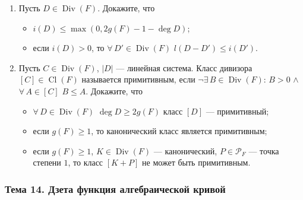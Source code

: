 \documentclass[a4paper, 12pt]{article}
\DeclareMathOperator{\Div}{Div}
\DeclareMathOperator{\Cl}{Cl}
\begin{document}
\begin{enumerate}[noitemsep,topsep=0pt]
    \item Пусть $D\in\Div(F)$. Докажите, что
    \begin{itemize}[noitemsep,topsep=0pt]
        \item $i(D)\leqslant \max(0,2g(F)-1-\deg D)$;
        \item если $i(D)>0$, то $\forall\, D'\in\Div(F)$ $l(D-D')\leqslant i(D')$.
    \end{itemize} %
    \item Пусть $C\in\Div(F)$, $|D|$ --- линейная система. Класс дивизора $[C]\in\Cl(F)$ называется примитивным, если $\neg\exists\,B\in\Div(F)$: $B>0$ $\land$ $\forall\,A\in[C]$ $B\leqslant A$. Докажите, что
    \begin{itemize}[noitemsep,topsep=0pt]
        \item $\forall\, D\in\Div(F)$ $\deg D \geqslant 2g(F)$ класс $[D]$ --- примитивный;
        \item если $g(F)\geqslant 1$, то канонический класс является примитивным;
        \item если $g(F)\geqslant 1$, $K\in\Div(F)$ --- канонический, $P\in\mathcal{P}_F$ --- точка степени $1$, то класс $[K+P]$ не может быть примитивным. 
    \end{itemize} %
\end{enumerate}

\subsubsection{Тема 14. Дзета функция алгебраической кривой}
\end{document}
